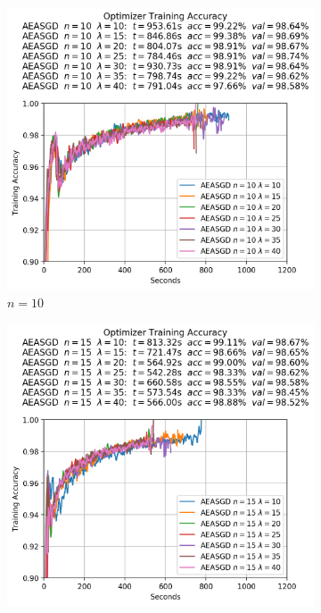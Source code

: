 \begin{figure}
  \centering
  \begin{subfigure}{.3\textwidth}
    \centering
    \includegraphics[width=\linewidth]{resources/images/aeasgd_experiments_workers_10}
    \caption{$n = 10$}
  \end{subfigure}
  \begin{subfigure}{.3\textwidth}
    \centering
    \includegraphics[width=\linewidth]{resources/images/aeasgd_experiments_workers_15}

\end{subfigure}
\end{figure}
